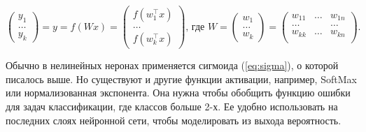 \begin{equation*}
\begin{pmatrix}
   y_1 \\
   \ldots \\
   y_k
\end{pmatrix} = y = f(Wx) =
\begin{pmatrix}
   f(w_1^\top x)\\
   \ldots \\
   f(w_k^\top x)
\end{pmatrix}\text{, где } W =
\begin{pmatrix}
   w_1 \\
   \ldots \\
   w_k
\end{pmatrix} =
\begin{pmatrix}
   w_{11} & \ldots & w_{1n}\\
   \ldots &  & \ldots\\
   w_{kk} & \ldots & w_{kn}\\
\end{pmatrix}.
\end{equation*}



Обычно в нелинейных неронах применяется сигмоида (\ref{eq:sigma}), о которой писалось выше. Но существуют и другие функции активации, например, SoftMax или нормализованная экспонента. Она нужна чтобы обобщить функцию ошибки для задач классификации, где классов больше 2-х. Ее удобно использовать на последних слоях нейронной сети, чтобы моделировать из выхода вероятность.


